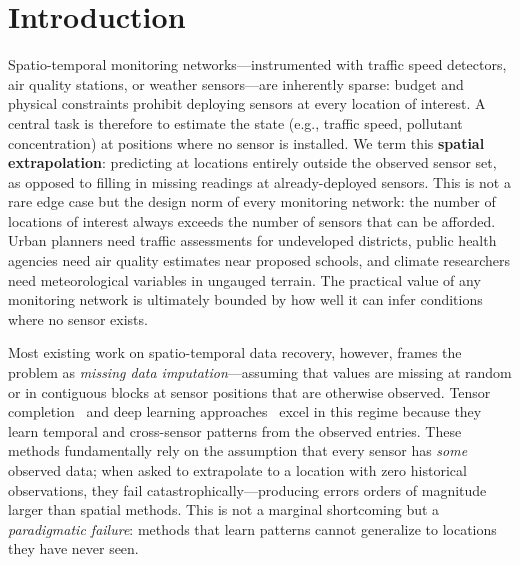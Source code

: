 \documentclass[journal]{IEEEtran}
\begin{document}
\section{Introduction}\label{sec:intro}

Spatio-temporal monitoring networks---instrumented with traffic speed detectors, air quality stations, or weather sensors---are inherently sparse: budget and physical constraints prohibit deploying sensors at every location of interest. A central task is therefore to estimate the state (e.g., traffic speed, pollutant concentration) at positions where no sensor is installed. We term this \textbf{spatial extrapolation}: predicting at locations entirely outside the observed sensor set, as opposed to filling in missing readings at already-deployed sensors. This is not a rare edge case but the design norm of every monitoring network: the number of locations of interest always exceeds the number of sensors that can be afforded. Urban planners need traffic assessments for undeveloped districts, public health agencies need air quality estimates near proposed schools, and climate researchers need meteorological variables in ungauged terrain. The practical value of any monitoring network is ultimately bounded by how well it can infer conditions where no sensor exists.

Most existing work on spatio-temporal data recovery, however, frames the problem as \emph{missing data imputation}---assuming that values are missing at random or in contiguous blocks at sensor positions that are otherwise observed. Tensor completion~\cite{liu2013tensor,carroll1970analysis,harshman1970foundations} and deep learning approaches~\cite{cao2018brits,du2023saits} excel in this regime because they learn temporal and cross-sensor patterns from the observed entries. These methods fundamentally rely on the assumption that every sensor has \emph{some} observed data; when asked to extrapolate to a location with zero historical observations, they fail catastrophically---producing errors orders of magnitude larger than spatial methods. This is not a marginal shortcoming but a \emph{paradigmatic failure}: methods that learn patterns cannot generalize to locations they have never seen.
\end{document}
